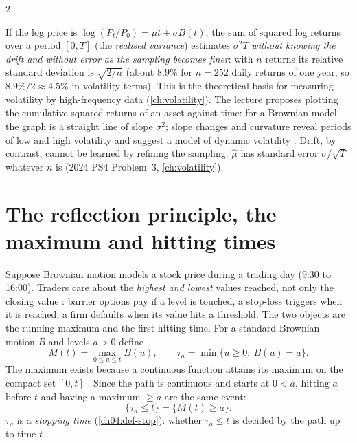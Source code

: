 \begin{paracol}{2}
\begin{finance}
If the log price is $\log(P_t/P_0)=\mu t+\sigma B(t)$, the sum of squared log returns over a period $[0,T]$ (the \emph{realised
variance}) estimates $\sigma^2T$ \emph{without knowing the drift and without error as the sampling becomes finer}: with
$n$ returns its relative standard deviation is $\sqrt{2/n}$ (about $8.9\%$ for $n=252$ daily returns of one year, so
$8.9\%/2\approx4.5\%$ in volatility terms). This is the theoretical basis for measuring volatility by high-frequency data
(\cref{ch:volatility}). The lecture proposes plotting the cumulative squared returns of an asset against time: for a Brownian model the
graph is a straight line of slope $\sigma^2$; slope changes and curvature reveal periods of low and high volatility and
suggest a model of dynamic volatility . Drift, by contrast, cannot be
learned by refining the sampling: $\hat\mu$ has standard error $\sigma/\sqrt T$ whatever $n$ is (2024 PS4 Problem~3,
\cref{ch:volatility}).
\end{finance}


\section{The reflection principle, the maximum and hitting times}\label{ch11:sec-reflection}

Suppose Brownian motion models a stock price during a trading day (9:30 to 16:00). Traders care about the \emph{highest
and lowest} values reached, not only the closing value : barrier options pay if a level is touched, a stop-loss triggers when it is
reached, a firm defaults when its value hits a threshold. The two objects are the running maximum and the first hitting time.
For a standard Brownian motion $B$ and levels $a>0$ define
\begin{equation}\label{ch11:eq-defM}
  M(t)=\max_{0\le u\le t}B(u),\qquad \tau_a=\min\{u\ge0:\ B(u)=a\}.
\end{equation}
The maximum exists because a continuous function attains its maximum on the compact set $[0,t]$ .
Since the path is continuous and starts at $0<a$, hitting $a$ before $t$ and having a maximum $\ge a$ are the same event:
\begin{equation}\label{ch11:eq-tauM}
  \{\tau_a\le t\}=\{M(t)\ge a\}.
\end{equation}
$\tau_a$ is a \emph{stopping time} (\cref{ch04:def-stop}): whether $\tau_a\le t$ is decided by the path up to time $t$
.


\end{paracol}
